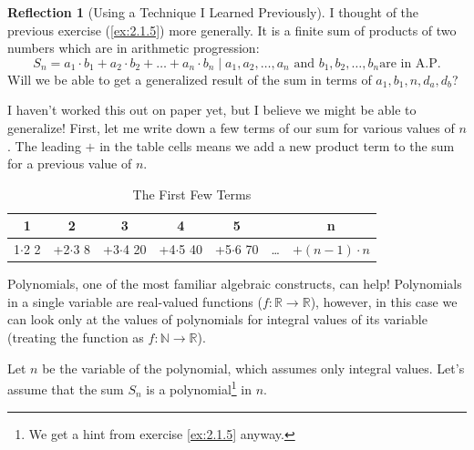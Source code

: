 \documentclass[11pt]{book}
\theoremstyle{definition}
\theoremstyle{plain}
\theoremstyle{definition}
\theoremstyle{problemstyle}
\theoremstyle{remark}
\theoremstyle{definition}
\newtheorem{reflection}{Reflection}
\begin{document}
\begin{reflection}[Using a Technique I Learned Previously]
    I thought of the previous exercise (\ref{ex:2.1.5}) more generally. It is a finite sum of products of two numbers which are in arithmetic progression:
    \[
        S_n=a_1\cdot b_1+a_2\cdot b_2+\dots+a_n\cdot b_n\mid a_1,a_2,\dots,a_n\text{ and }b_1,b_2,\dots,b_n\text {are in A.P.}
    \]
    Will we be able to get a generalized result of the sum in terms of $a_1,b_1,n,d_a,d_b$?

    I haven't worked this out on paper yet, but I believe we might be able to generalize! First, let me write down a few terms of our sum for various values of $n$. The leading $+$ in the table cells means we add a new product term to the sum for a previous value of $n$.
\begin{table}[H] 
\centering
\begin{tabular}{|c|c|c|c|c|c|c|}
 \hline
    1&2&3&4&5&&n\\ \hline
    \hline
    \makecell{1$\cdot$2\\2}&\makecell{+2$\cdot$3\\8}&\makecell{+3$\cdot$4\\20}&\makecell{+4$\cdot$5\\40}&\makecell{+5$\cdot$6\\70}&\dots&$+(n-1)\cdot n$\\ \hline
\end{tabular}
    \caption{The First Few Terms}
\end{table}

    Polynomials, one of the most familiar algebraic constructs, can help! Polynomials in a single variable are real-valued functions ($f:\mathbb{R}\to\mathbb{R}$), however, in this case we can look only at the values of polynomials for integral values of its variable (treating the function as $f:\mathbb{N}\to\mathbb{R}$).

    Let $n$ be the variable of the polynomial, which assumes only integral values. Let's assume that the sum $S_n$ is a polynomial\footnote{We get a hint from exercise \ref{ex:2.1.5} anyway.} in $n$. 


\end{reflection}
\end{document}
